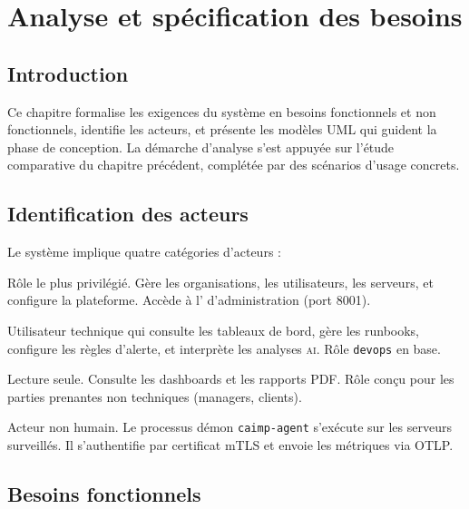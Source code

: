 \chapter{Analyse et spécification des besoins}

\section*{Introduction}

Ce chapitre formalise les exigences du système \caimp{} en besoins fonctionnels
et non fonctionnels, identifie les acteurs, et présente les modèles UML qui
guident la phase de conception. La démarche d'analyse s'est appuyée sur l'étude
comparative du chapitre précédent, complétée par des scénarios d'usage concrets.

\section{Identification des acteurs}

Le système \caimp{} implique quatre catégories d'acteurs :

\begin{description}[leftmargin=2.5cm, style=nextline]
  \item[\textbf{Administrateur}] Rôle le plus privilégié. Gère les organisations,
    les utilisateurs, les serveurs, et configure la plateforme. Accède à l'\api{}
    d'administration (port 8001).
  \item[\textbf{Opérateur}] Utilisateur technique qui consulte les tableaux de
    bord, gère les runbooks, configure les règles d'alerte, et interprète les
    analyses \textsc{ai}. Rôle \texttt{devops} en base.
  \item[\textbf{Viewer}] Lecture seule. Consulte les dashboards et les rapports
    PDF. Rôle conçu pour les parties prenantes non techniques (managers, clients).
  \item[\textbf{Agent système}] Acteur non humain. Le processus démon
    \texttt{caimp-agent} s'exécute sur les serveurs surveillés. Il s'authentifie
    par certificat mTLS et envoie les métriques via OTLP.
\end{description}

\section{Besoins fonctionnels}

